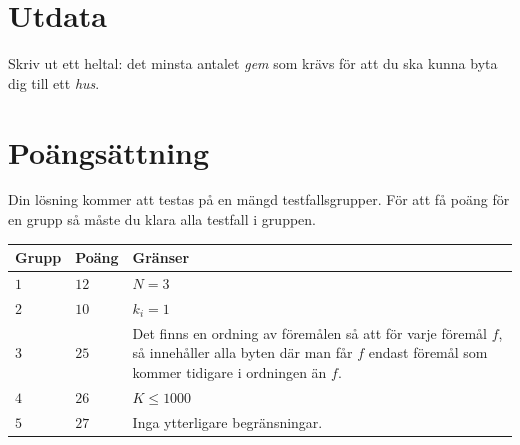 \section*{Utdata}
Skriv ut ett heltal: det minsta antalet \emph{gem} som krävs för att du ska kunna 
byta dig till ett \emph{hus}. 

\section*{Poängsättning}
Din lösning kommer att testas på en mängd testfallsgrupper.
För att få poäng för en grupp så måste du klara alla testfall i gruppen.

\noindent
\begin{tabular}{| l | l | p{12cm} |}
  \hline
  \textbf{Grupp} & \textbf{Poäng} & \textbf{Gränser} \\ \hline
  $1$ & $12$ & $N = 3$ \\ \hline
  $2$ & $10$ & $k_i = 1$ \\ \hline
  $3$ & $25$ & Det finns en ordning av föremålen så att för varje föremål
  $f$, så innehåller alla byten där man får $f$ endast föremål som kommer tidigare i ordningen än $f$. \\ \hline
  $4$ & $26$ & $K \leq 1000$ \\ \hline
  $5$ & $27$ & Inga ytterligare begränsningar. \\ \hline
\end{tabular}
